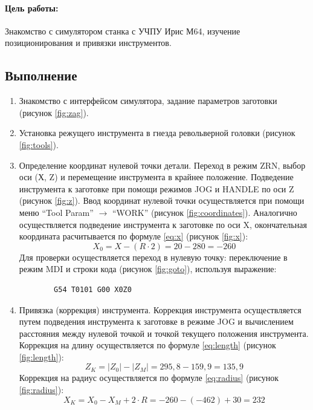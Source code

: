\paragraph{Цель работы:} Знакомство с симулятором станка с УЧПУ Ирис М64, изучение позиционирования и привязки инструментов.

\subsection*{Выполнение}

\begin{enumerate}
    \item Знакомство с интерфейсом симулятора, задание параметров заготовки (рисунок \ref{fig:zag}).
    \item Установка режущего инструмента в гнезда револьверной головки (рисунок \ref{fig:tools}).
    \item Определение координат нулевой точки детали.
        \subitem Переход в режим ZRN, выбор оси (Х, Z) и перемещение инструмента в крайнее положение.
        \subitem Подведение инструмента к заготовке при помощи режимов JOG и HANDLE по оси Z (рисунок \ref{fig:z}).
        \subitem Ввод координат нулевой точки осуществляется при помощи меню ``Tool Param'' $\to$ ``WORK'' (рисунок \ref{fig:coordinates}).
        \subitem Аналогично осуществляется подведение инструмента к заготовке по оси X, окончательная координата расчитывается по формуле \ref{eq:x} (рисунок \ref{fig:x}):
        \begin{equation}\label{eq:x}
            X_0 = X - (R \cdot 2) = 20 - 280 = -260
        \end{equation}
        \subitem Для проверки осуществляется переход в нулевую точку: переключение в режим MDI и строки кода (рисунок \ref{fig:goto}), используя выражение:
        \begin{verbatim}
        G54 T0101 G00 X0Z0
        \end{verbatim}
    \item Привязка (коррекция) инструмента.
        \subitem Коррекция инструмента осуществляется путем подведения инструмента к заготовке в режиме JOG и вычислением расстояния между нулевой точкой и точкой текущего положения инструмента.
        \subitem Коррекция на длину осуществляется по формуле \ref{eq:length} (рисунок \ref{fig:length}):
        \begin{equation}\label{eq:length}
            Z_K = |Z_0| - |Z_M| = 295,8 - 159,9 = 135,9
        \end{equation}
        \subitem Коррекция на радиус осуществляется по формуле \ref{eq:radius} (рисунок \ref{fig:radius}):
        \begin{equation}\label{eq:radius}
            X_K = X_0 - X_M + 2 \cdot R = -260 - (-462) + 30 = 232
        \end{equation}
\end{enumerate}

